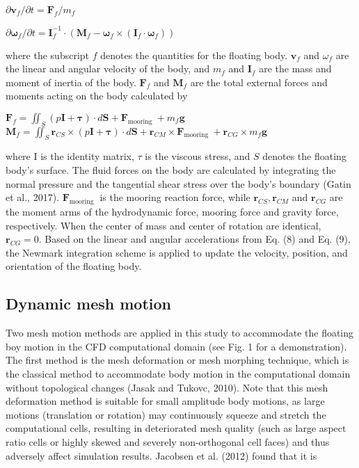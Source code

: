 $\partial \mathbf{v}_{f} / \partial t=\mathbf{F}_{f} / m_{f}$

$\partial \boldsymbol{\omega}_{f} / \partial t=\mathbf{I}_{f}^{-1} \cdot\left(\mathbf{M}_{f}-\boldsymbol{\omega}_{f} \times\left(\mathbf{I}_{f} \cdot \boldsymbol{\omega}_{f}\right)\right)$

where the subscript $f$ denotes the quantities for the floating body. $\mathbf{v}_{f}$ and $\omega_{f}$ are the linear and angular velocity of the body, and $m_{f}$ and $\mathbf{I}_{f}$ are the mass and moment of inertia of the body. $\mathbf{F}_{f}$ and $\mathbf{M}_{f}$ are the total external forces and moments acting on the body calculated by

$\mathbf{F}_{f}=\iint_{S}(p \mathbf{I}+\boldsymbol{\tau}) \cdot d \mathbf{S}+\mathbf{F}_{\text {mooring }}+m_{f} \mathbf{g}$
$\mathbf{M}_{f}=\iint_{S} \boldsymbol{r}_{C S} \times(p \mathbf{I}+\boldsymbol{\tau}) \cdot d \mathbf{S}+\boldsymbol{r}_{C M} \times \mathbf{F}_{\text {mooring }}+\boldsymbol{r}_{C G} \times m_{f} \mathbf{g}$

where I is the identity matrix, $\tau$ is the viscous stress, and $S$ denotes the floating body's surface. The fluid forces on the body are calculated by integrating the normal pressure and the tangential shear stress over the body's boundary (Gatin et al., 2017). $\mathbf{F}_{\text {mooring }}$ is the mooring reaction force, while $\boldsymbol{r}_{C S}, \boldsymbol{r}_{C M}$ and $\boldsymbol{r}_{C G}$ are the moment arms of the hydrodynamic force, mooring force and gravity force, respectively. When the center of mass and center of rotation are identical, $\boldsymbol{r}_{C G}=0$. Based on the linear and angular accelerations from Eq. (8) and Eq. (9), the Newmark integration scheme is applied to update the velocity, position, and orientation of the floating body.

\subsection{Dynamic mesh motion}

Two mesh motion methods are applied in this study to accommodate the floating boy motion in the CFD computational domain (see Fig. 1 for a demonstration). The first method is the mesh deformation or mesh morphing technique, which is the classical method to accommodate body motion in the computational domain without topological changes (Jasak and Tukovc, 2010). Note that this mesh deformation method is suitable for small amplitude body motions, as large motions (translation or rotation) may continuously squeeze and stretch the computational cells, resulting in deteriorated mesh quality (such as large aspect ratio cells or highly skewed and severely non-orthogonal cell faces) and thus adversely affect simulation results. Jacobsen et al. (2012) found that it is


